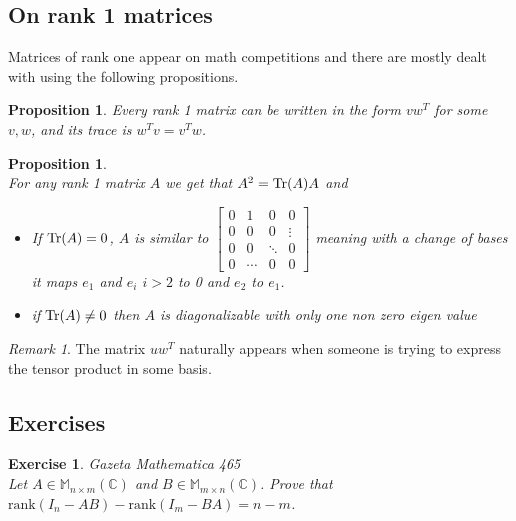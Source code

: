 \documentclass[12pt]{article}
\newcommand{\Rank}{\mathrm{rank}}
\newtheorem{prop}[theorem]{Proposition}
\theoremstyle{definition}
\theoremstyle{remark}
\newtheorem*{remark}{Remark}
\theoremstyle{plain}
\newtheorem{ex}[subsubsection]{Exercise}
\begin{document}
\subsection{On rank 1 matrices}
Matrices of rank one appear on math competitions and there are mostly dealt with using the following propositions. 
\begin{prop}
    Every rank 1 matrix can be written in the form $vw^T$ for some $v,w$, and its trace is $w^Tv=v^Tw$.
\end{prop}
\begin{prop}\leavevmode \\
    For any rank 1 matrix $A$ we get that $A^2=\Tr(A) A$ and \begin{itemize}
        \item If $\Tr(A)=0$, $A$ is similar to $ \begin{bmatrix}
0 & 1 & 0 & 0 \\
0 & 0 & 0 & \vdots \\
0 & 0 & \ddots & 0 \\
0 & \cdots & 0 & 0 
\end{bmatrix}  $ meaning with a change of bases it maps  $e_1$ and $e_i$ $i>2$ to 0 and $e_2$ to $e_1$.
\item if $\Tr(A)\neq0$ then $A$ is diagonalizable with only one non zero eigen value
    \end{itemize}
\end{prop}
\begin{remark}
    The matrix $uw^T$ naturally appears when someone is trying to express the tensor product in some basis.
\end{remark}
\subsection{Exercises}
\begin{ex}\textup{Gazeta Mathematica 465}\\
    Let $A\in \mathbb{M}_{n\times m}(\mathbb{C})$ and $B\in \mathbb{M}_{m\times n}(\mathbb{C})$.
    Prove that $\Rank(I_n-AB)-\Rank(I_m-BA)=n-m$.
\end{ex}
\end{document}
